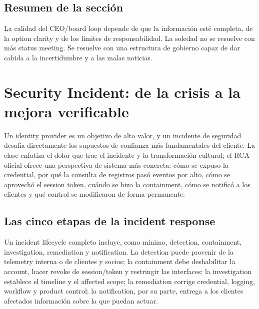 \documentclass[a4paper]{article}
\begin{document}

\subsection{Resumen de la sección}

La calidad del CEO/board loop depende de que la información esté completa, de la option clarity y de los límites de responsabilidad. La soledad no se resuelve con más status meeting. Se resuelve con una estructura de gobierno capaz de dar cabida a la incertidumbre y a las malas noticias.
\section{Security Incident: de la crisis a la mejora verificable}

Un identity provider es un objetivo de alto valor, y un incidente de seguridad desafía directamente los supuestos de confianza más fundamentales del cliente. La clase enfatiza el dolor que trae el incidente y la transformación cultural; el RCA oficial ofrece una perspectiva de sistema más concreta: cómo se expuso la credential, por qué la consulta de registros pasó eventos por alto, cómo se aprovechó el session token, cuándo se hizo la containment, cómo se notificó a los clientes y qué control se modificaron de forma permanente.

\subsection{Las cinco etapas de la incident response}

Un incident lifecycle completo incluye, como mínimo, detection, containment, investigation, remediation y notification. La detection puede provenir de la telemetry interna o de clientes y socios; la containment debe deshabilitar la account, hacer revoke de session/token y restringir las interfaces; la investigation establece el timeline y el affected scope; la remediation corrige credential, logging, workflow y product control; la notification, por su parte, entrega a los clientes afectados información sobre la que puedan actuar.
\end{document}
